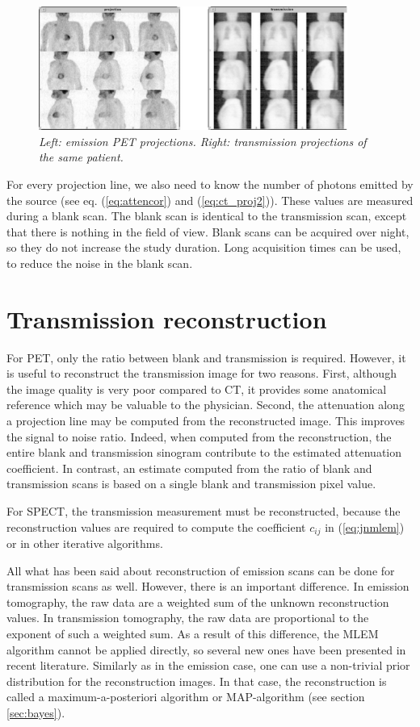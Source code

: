\begin{figure}[tb]
\centering
\includegraphics[width=0.9\textwidth]{figs/fig_transproj.pdf}
\caption{\label{fig:transproj} \emph{Left: emission PET projections. Right:
transmission projections of the same patient.}}
\end{figure}

For every projection line, we also need to know the number of photons
emitted by the source (see eq. (\ref{eq:attencor}) and
(\ref{eq:ct_proj2})). These values are measured during a blank
scan. The blank scan is identical to the transmission scan, except
that there is nothing in the field of view. Blank scans can be
acquired over night, so they do not increase the study duration. Long
acquisition times can be used, to reduce the noise in the blank scan.

\section{Transmission reconstruction}
For PET, only the ratio between blank and transmission is required. However,
it is useful to reconstruct the transmission image for two reasons. First,
although the image quality is very poor compared to CT, it provides some
anatomical reference which may be valuable to the physician. Second, the
attenuation along a projection line may be computed from the reconstructed
image. This improves the signal to noise ratio. Indeed, when computed from the
reconstruction, the entire blank and transmission sinogram contribute to the
estimated attenuation coefficient. In contrast, an estimate computed from the
ratio of blank and transmission scans is based on a single blank and
transmission pixel value.

For SPECT, the transmission measurement must be reconstructed, because the
reconstruction values are required to compute the coefficient $c_{ij}$ in
(\ref{eq:jnmlem}) or in other iterative algorithms.

All what has been said about reconstruction of emission scans can be done for
transmission scans as well. However, there is an important difference. In
emission tomography, the raw data are a weighted sum of the unknown
reconstruction values. In transmission tomography, the raw data are
proportional to the exponent of such a weighted sum. As a result of this
difference, the MLEM algorithm cannot be applied directly, so several new
ones have been presented in recent literature. Similarly as in the emission
case, one can use a non-trivial prior distribution for the reconstruction
images. In that case, the reconstruction is called a maximum-a-posteriori
algorithm or MAP-algorithm (see section \ref{sec:bayes}).

